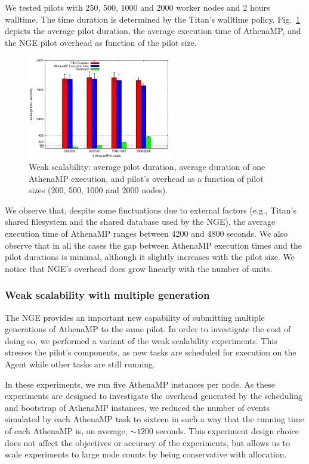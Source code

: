 We tested pilots with 250, 500, 1000 and 2000 worker nodes and 2 hours
walltime. The time duration is determined by the Titan's walltime policy.
Fig.~\ref{fig:weakScal1a} depicts the average pilot duration, the average
execution time of AthenaMP, and the NGE pilot overhead as function of the
pilot size.

\begin{figure}[!t]
        \includegraphics[height=4.5cm,width=\columnwidth]{./figures/NGE/weak1.pdf}
   	\vspace{-0.3in}
    \caption{Weak scalability: average pilot duration, average duration of one AthenaMP execution, and pilot's overhead as a function of pilot sizes (200, 500, 1000 and 2000 nodes).}
\label{fig:weakScal1a}
\end{figure}

We observe that, despite some fluctuations due to external factors (e.g.,
Titan's shared filesystem and the shared database used by the NGE), the
average execution time of AthenaMP ranges between 4200 and 4800 seconds. We
also observe that in all the cases the gap between AthenaMP execution times
and the pilot durations is minimal, although it slightly increases with the
pilot size. We notice that NGE's overhead does grow linearly with the number
of units.

\subsubsection{Weak scalability with multiple generation }

The NGE provides an important new capability of submitting multiple
generations of AthenaMP to the same pilot. In order to investigate the cost
of doing so, we performed a variant of the weak scalability experiments. This
stresses the pilot's components, as new tasks are scheduled for execution on
the Agent while other tasks are still running.

In these experiments, we run five AthenaMP instances per node. As these
experiments are designed to investigate the overhead generated by the
scheduling and bootstrap of AthenaMP instances, we reduced the number of
events simulated by each AthenaMP task to sixteen in such a way that the
running time of each AthenaMP is, on average, $\sim 1200$ seconds. This
experiment design choice does not affect the objectives or accuracy of the
experiments, but allows us to scale experiments to large node counts by being
conservative with allocation.

